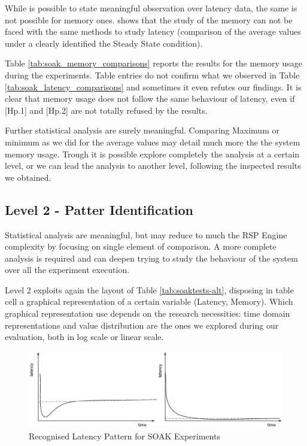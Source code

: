 While is possible to state meaningful observation over latency data, the same is not possible for memory ones. \name shows that the study of the memory can not be faced with the same methods to study latency (comparison of the average values under a clearly identified the Steady State condition). 

Table \ref{tab:soak_memory_comparisons} reports the results for the memory usage during the experiments. Table entries do not confirm what we observed in Table \ref{tab:soak_latency_comparisons} and sometimes it even refutes our findings. It is clear that memory usage does not follow the same behaviour of latency, even if [Hp.1] and [Hp.2] are not totally refused by the results.



Further statistical analysis are surely meaningful. Comparing Maximum or minimum as we did for the average values may detail much more the the system memory usage. Trough \name it is possible explore completely the analysis at a certain level, or we can lead the analysis to another level, following the inspected results we obtained.


\subsection{Level 2 - Patter Identification}\label{sec:eval-level2}

Statistical analysis are meaningful, but may reduce to much the RSP Engine complexity by focusing on single element of comparison. A more complete analysis is required and \name can deepen trying to study the behaviour of the system over all the experiment execution.

Level 2 exploits again the layout of Table \ref{tab:soaktests-alt}, disposing in table cell a graphical representation of a certain variable (Latency, Memory). Which graphical representation use depends on the research necessities: time domain representations and value distribution are the ones we explored during our evaluation, both in log scale or linear scale.

\begin{figure}[hbt]
  \centering
	\includegraphics[width=\linewidth]{images/level2-pattern}
	\caption{Recognised Latency Pattern for SOAK Experiments} 
  	\label{fig:level2-pattern}
\end{figure}

